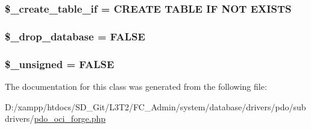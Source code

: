 \subsubsection[{\$\+\_\+create\+\_\+table\+\_\+if}]{\setlength{\rightskip}{0pt plus 5cm}\$\+\_\+create\+\_\+table\+\_\+if = \textquotesingle{}C\+R\+E\+A\+T\+E T\+A\+B\+L\+E I\+F N\+O\+T E\+X\+I\+S\+T\+S\textquotesingle{}\hspace{0.3cm}{\ttfamily [protected]}}\label{class_c_i___d_b__pdo__oci__forge_a2f6484fcb8d1dc3eef67a637227cd583}
\hypertarget{class_c_i___d_b__pdo__oci__forge_a8305b12fc17f6f87778260ebdff287b4}{}
\subsubsection[{\$\+\_\+drop\+\_\+database}]{\setlength{\rightskip}{0pt plus 5cm}\$\+\_\+drop\+\_\+database = F\+A\+L\+S\+E\hspace{0.3cm}{\ttfamily [protected]}}\label{class_c_i___d_b__pdo__oci__forge_a8305b12fc17f6f87778260ebdff287b4}
\hypertarget{class_c_i___d_b__pdo__oci__forge_aae977ae6d61fa183f0b25422b6ddc31c}{}
\subsubsection[{\$\+\_\+unsigned}]{\setlength{\rightskip}{0pt plus 5cm}\$\+\_\+unsigned = F\+A\+L\+S\+E\hspace{0.3cm}{\ttfamily [protected]}}\label{class_c_i___d_b__pdo__oci__forge_aae977ae6d61fa183f0b25422b6ddc31c}


The documentation for this class was generated from the following file\+:\begin{DoxyCompactItemize}
\item 
D\+:/xampp/htdocs/\+S\+D\+\_\+\+Git/\+L3\+T2/\+F\+C\+\_\+\+Admin/system/database/drivers/pdo/subdrivers/\hyperlink{pdo__oci__forge_8php}{pdo\+\_\+oci\+\_\+forge.\+php}\end{DoxyCompactItemize}
